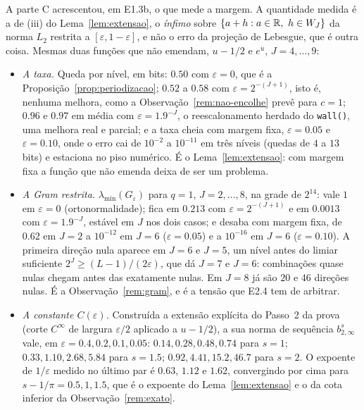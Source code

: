 \documentclass[11pt,a4paper]{article}
\begin{document}
A parte C acrescentou, em E1.3b, o que mede a margem. A quantidade medida é
a de (iii) do Lema~\ref{lem:extensao}, o \emph{ínfimo} sobre
$\{a + h : a \in \mathbb{R},\ h \in W_{J}\}$ da norma $L_{2}$ restrita a
$[\varepsilon, 1-\varepsilon]$, e não o erro da projeção de Lebesgue, que é
outra coisa. Mesmas duas funções que não emendam, $u - 1/2$ e $e^{u}$,
$J = 4, \dots, 9$:
\begin{itemize}[nosep]
  \item \emph{A taxa.} Queda por nível, em bits: $0.50$ com
    $\varepsilon = 0$, que é a Proposição~\ref{prop:periodizacao};
    $0.52$ a $0.58$ com $\varepsilon = 2^{-(J+1)}$, isto é, nenhuma melhora,
    como a Observação~\ref{rem:nao-encolhe} prevê para $c = 1$; $0.96$ e
    $0.97$ em média com $\varepsilon = 1.9^{-J}$, o reescalonamento herdado
    do \texttt{wall()}, uma melhora real e parcial; e a taxa cheia com
    margem fixa, $\varepsilon = 0.05$ e $\varepsilon = 0.10$, onde o erro
    cai de $10^{-2}$ a $10^{-11}$ em três níveis (quedas de $4$ a $13$ bits)
    e estaciona no piso numérico. É o Lema~\ref{lem:extensao}: com margem
    fixa a função que não emenda deixa de ser um problema.
  \item \emph{A Gram restrita.} $\lambda_{\min}(G_{\varepsilon})$ para
    $q = 1$, $J = 2, \dots, 8$, na grade de $2^{14}$: vale $1$ em
    $\varepsilon = 0$ (ortonormalidade); fica em $0.213$ com
    $\varepsilon = 2^{-(J+1)}$ e em $0.0013$ com $\varepsilon = 1.9^{-J}$,
    estável em $J$ nos dois casos; e desaba com margem fixa, de $0.62$ em
    $J = 2$ a $10^{-12}$ em $J = 6$ ($\varepsilon = 0.05$) e a $10^{-16}$ em
    $J = 6$ ($\varepsilon = 0.10$). A primeira direção nula aparece em
    $J = 6$ e $J = 5$, um nível antes do limiar suficiente
    $2^{J} \ge (L-1)/(2\varepsilon)$, que dá $J = 7$ e $J = 6$: combinações
    quase nulas chegam antes das exatamente nulas. Em $J = 8$ já são $20$ e
    $46$ direções nulas. É a Observação~\ref{rem:gram}, e é a tensão que
    E2.4 tem de arbitrar.
  \item \emph{A constante $C(\varepsilon)$.} Construída a extensão
    explícita do Passo~2 da prova (corte $C^{\infty}$ de largura
    $\varepsilon/2$ aplicado a $u - 1/2$), a sua norma de sequência
    $b^{s}_{2,\infty}$ vale, em $\varepsilon = 0.4, 0.2, 0.1, 0.05$:
    $0.14, 0.28, 0.48, 0.74$ para $s = 1$; $0.33, 1.10, 2.68, 5.84$ para
    $s = 1.5$; $0.92, 4.41, 15.2, 46.7$ para $s = 2$. O expoente de
    $1/\varepsilon$ medido no último par é $0.63$, $1.12$ e $1.62$,
    convergindo por cima para $s - 1/\pi = 0.5, 1, 1.5$, que é o expoente do
    Lema~\ref{lem:extensao} e o da cota inferior da
    Observação~\ref{rem:exato}.
\end{itemize}
\end{document}
